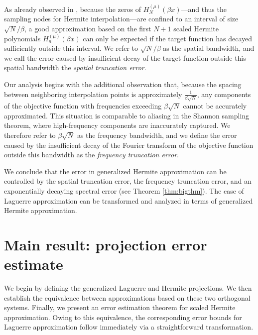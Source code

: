 \documentclass[pdflatex,sn-aps]{sn-jnl}%
\theoremstyle{thmstyleone}%
\theoremstyle{thmstyletwo}%
\theoremstyle{thmstylethree}%
\begin{document}
As already observed in \cite{tang1993hermite}, because the zeros of $H_N^{(\mu)}(\beta x)$—and thus the sampling nodes for Hermite interpolation—are confined to an interval of size ${\sqrt{N}}/{\beta}$, a good approximation based on the first $N+1$ scaled Hermite polynomials $H_n^{(\mu)}(\beta x)$ can only be expected if the target function has decayed sufficiently outside this interval. We refer to ${\sqrt{N}}/{\beta}$ as the spatial bandwidth, and we call the error caused by insufficient decay of the target function outside this spatial bandwidth the \emph{spatial truncation error}.

Our analysis begins with the additional observation that, because the spacing between neighboring interpolation points is approximately $\frac{1}{\beta \sqrt{N}}$, any components of the objective function with frequencies exceeding $\beta \sqrt{N}$ cannot be accurately approximated. This situation is comparable to aliasing in the Shannon sampling theorem, where high-frequency components are inaccurately captured. We therefore refer to $\beta\sqrt{N}$ as the frequency bandwidth, and we define the error caused by the insufficient decay of the Fourier transform of the objective function outside this bandwidth as the \emph{frequency truncation error}.

We conclude that the error in generalized Hermite approximation can be controlled by the spatial truncation error, the frequency truncation error, and an exponentially decaying spectral error (see Theorem \ref{thm:bigthm}). The case of Laguerre approximation can be transformed and analyzed in terms of generalized Hermite approximation.

\section{Main result: projection error estimate}
\label{sec:main}
We begin by defining the generalized Laguerre and Hermite projections. We then establish the equivalence between approximations based on these two orthogonal systems. Finally, we present an error estimation theorem for scaled Hermite approximation. Owing to this equivalence, the corresponding error bounds for Laguerre approximation follow immediately via a straightforward transformation.
\end{document}
